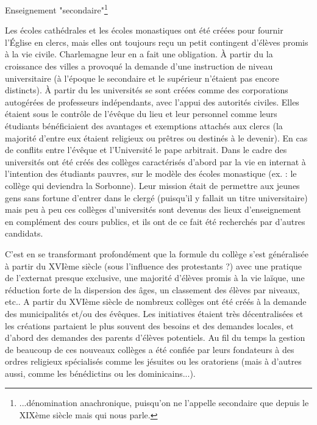 Enseignement "secondaire"\footnote{...dénomination anachronique, puisqu'on ne l'appelle secondaire que depuis le XIXème siècle mais qui nous parle.} 

Les écoles cathédrales et les écoles monastiques ont été créées pour fournir l'Église en clercs, mais elles ont toujours reçu un petit contingent d'élèves promis à la vie civile. Charlemagne leur en a fait une obligation. À partir du  la croissance des villes a provoqué la demande d'une instruction de niveau universitaire (à l'époque le secondaire et le supérieur n'étaient pas encore distincts). À partir du  les universités se sont créées comme des corporations autogérées de professeurs indépendants, avec l'appui des autorités civiles. Elles étaient sous le contrôle de l'évêque du lieu et leur personnel comme leurs étudiants bénéficiaient des avantages et exemptions attachés aux clercs (la majorité d'entre eux étaient religieux ou prêtres ou destinés à le devenir). En cas de conflits entre l'évêque et l'Université le pape arbitrait. Dans le cadre des universités ont été créés des collèges caractérisés d'abord par la vie en internat à l'intention des étudiants pauvres, sur le modèle des écoles monastique (ex. : le collège qui deviendra la Sorbonne). Leur mission était de permettre aux jeunes gens sans fortune d'entrer dans le clergé (puisqu'il y fallait un titre universitaire) mais peu à peu ces collèges d'universités sont devenus des lieux d'enseignement en complément des cours publics, et ils ont de ce fait été recherchés par d'autres candidats. 

C'est en se transformant profondément que la formule du collège s'est généralisée à partir du XVIème siècle (sous l'influence des protestants ?) avec une pratique de l'externat presque exclusive, une majorité d'élèves promis à la vie laïque, une réduction forte de la dispersion des âges, un classement des élèves par niveaux, etc.. A partir du XVIème siècle de nombreux collèges ont été créés à la demande des municipalités et/ou des évêques. Les initiatives étaient très décentralisées et les créations partaient le plus souvent des besoins et des demandes locales, et d'abord des demandes des parents d'élèves potentiels. Au fil du temps la gestion de beaucoup de ces nouveaux collèges a été confiée par leurs fondateurs à des ordres religieux spécialisés comme les jésuites ou les oratoriens (mais à d'autres aussi, comme les bénédictins ou les dominicains...). 

